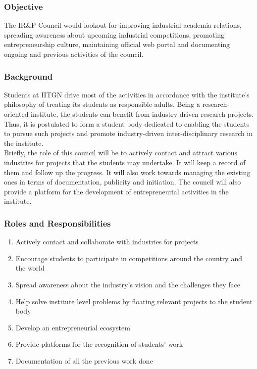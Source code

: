 \documentclass[12pt]{article}
\begin{document}
\subsubsection{Objective}
The IR\&P Council would lookout for improving industrial-academia relations, spreading awareness about upcoming industrial competitions, promoting entrepreneurship culture, maintaining official web portal and documenting ongoing and previous activities of the council.

\subsubsection{Background}
Students at IITGN drive most of the activities in accordance with the institute’s philosophy of treating its students as responsible adults. Being a research-oriented institute, the students can benefit from industry-driven research projects. Thus, it is postulated to form a student body dedicated to enabling the students to pursue such projects and promote industry-driven inter-disciplinary research in the institute. \\

\noindent Briefly, the role of this council will be to actively contact and attract various industries for projects that the students may undertake. It will keep a record of them and follow up the progress. It will also work towards managing the existing ones in terms of documentation, publicity and initiation. The council will also provide a platform for the development of entrepreneurial activities in the institute.


\subsubsection{Roles and Responsibilities}
\begin{enumerate}
    \item Actively contact and collaborate with industries for projects
    \item Encourage students to participate in competitions around the country and the world
    \item Spread awareness about the industry's vision and the challenges they face
    \item Help solve institute level problems by floating relevant projects to the student body
    \item Develop an entrepreneurial ecosystem
    \item Provide platforms for the recognition of students’ work
    \item Documentation of all the previous work done
\end{enumerate}
\end{document}
